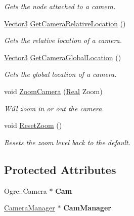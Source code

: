 \begin{DoxyCompactItemize}
\begin{DoxyCompactList}\small\item\em Gets the node attached to a camera. \item\end{DoxyCompactList}\item 
\hyperlink{classphys_1_1Vector3}{Vector3} \hyperlink{classphys_1_1Camera_a771fc7005191c3f83ac1fedb09699943}{GetCameraRelativeLocation} ()
\begin{DoxyCompactList}\small\item\em Gets the relative location of a camera. \item\end{DoxyCompactList}\item 
\hyperlink{classphys_1_1Vector3}{Vector3} \hyperlink{classphys_1_1Camera_a53b61b6c163270ffb4f46eb66a973b10}{GetCameraGlobalLocation} ()
\begin{DoxyCompactList}\small\item\em Gets the global location of a camera. \item\end{DoxyCompactList}\item 
void \hyperlink{classphys_1_1Camera_a1cb593d12be4e6e1e51cb8f74ce2d97c}{ZoomCamera} (\hyperlink{namespacephys_af7eb897198d265b8e868f45240230d5f}{Real} Zoom)
\begin{DoxyCompactList}\small\item\em Will zoom in or out the camera. \item\end{DoxyCompactList}\item 
void \hyperlink{classphys_1_1Camera_a181465e6add36c07a63fdd26aee7c69a}{ResetZoom} ()
\begin{DoxyCompactList}\small\item\em Resets the zoom level back to the default. \item\end{DoxyCompactList}\end{DoxyCompactItemize}
\subsection*{Protected Attributes}
\begin{DoxyCompactItemize}
\item 
\hypertarget{classphys_1_1Camera_a91622148b9b9a9ae1554c828f7e2fc89}{
Ogre::Camera $\ast$ {\bfseries Cam}}
\label{d9/df8/classphys_1_1Camera_a91622148b9b9a9ae1554c828f7e2fc89}

\item 
\hypertarget{classphys_1_1Camera_a909203ede748deb1b587a8758ba8cec4}{
\hyperlink{classphys_1_1CameraManager}{CameraManager} $\ast$ {\bfseries CamManager}}
\label{d9/df8/classphys_1_1Camera_a909203ede748deb1b587a8758ba8cec4}

\end{DoxyCompactItemize}



